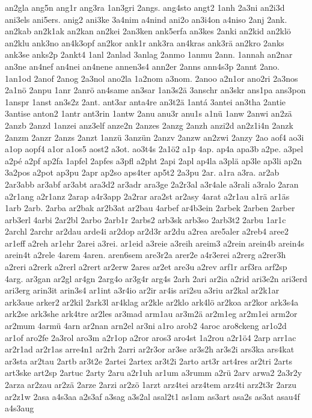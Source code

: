 {an2gla
ang5n
ang1r
ang3ra
1an3gri
2angs.
ang4sto
angt2
1anh
2a3ni
an2i3d
ani3els
ani5ers.
anig2
ani3ke
3a4nim
a4nind
ani2o
an3i4on
a4niso
2anj
2ank.
an2kab
an2k1ak
an2kan
an2kei
2an3ken
ank5erfa
an3kes
2anki
an2kid
an2klö
an2klu
ank3no
an4k3opf
an2kor
ank1r
ank3ra
an4kras
ank3rä
an2kro
2anks
ank3se
anks2p
2ankt4
1anl
2anlad
3anlag
2anmo
1anmu
2ann.
1annah
an2nar
an3ne
an4nef
an4nei
an4nene
annen3s4
ann2er
2anns
ann4s3p
2annt
2ano.
1an1od
2anof
2anog
2a3nol
ano2la
1a2nom
a3nom.
2anoo
a2n1or
ano2ri
2a3nos
2a1nö
2anpu
1anr
2anrö
an4same
an3sar
1an3s2ä
3anschr
an3skr
ans1pa
ans3pon
1anspr
1anst
an3s2z
2ant.
ant3ar
anta4re
an3t2ä
1antá
3antei
an3tha
2antie
3antise
anton2
1antr
ant3rin
1antw
2anu
anu3r
anu1s
a1nü
1anw
2anwi
an2zä
2anzb
2anzd
1anzei
anz3elf
anze2n
2anzes
2anzg
2anzh
anzi2d
an2z1i4n
2anzk
2anzm
2anzr
2anzs
2anzt
1anzü
3anzün
2anzv
2anzw
an2zwi
2anzy
2ao
aof4
ao3i
a1op
aopf4
a1or
a1os5
aost2
a3ot.
ao3t4s
2a1ö2
a1p
4ap.
ap4a
apa3b
a2pe.
a3pel
a2pé
a2pf
ap2fa
1apfel
2apfes
a3pfl
a2pht
2api
2apl
ap4la
a3plä
ap3le
ap3li
ap2n
3a2pos
a2pot
ap3pu
2apr
ap2so
aps4ter
ap5t2
2a3pu
2ar.
a1ra
a3ra.
ar2ab
2ar3abb
ar3abf
ar3abt
ara3d2
ar3adr
ara3ge
2a2r3al
a3r4ale
a3rali
a3ralo
2aran
a2r1ang
a2r1anz
2arap
a4r3app
2a2rar
ara2st
ar2asy
4arat
a2r1au
a1rä
ar1äs
1arb
2arb.
2arba
ar2bak
ar2b3at
ar2bau
4arbef
ar4b3ein
2arbek
2arben
2arber
arb3erl
4arbi
2ar2bl
2arbo
2arb1r
2arbs2
arb3sk
arb3so
2arb3t2
2arbu
1ar1c
2archl
2archr
ar2dau
arde4i
ar2dop
ar2d3r
ar2du
a2rea
are5aler
a2reb4
aree2
ar1eff
a2reh
ar1ehr
2arei
a3rei.
ar1eid
a3reie
a3reih
areim3
a2rein
arein4b
arein4s
arein4t
a2rele
4arem
4aren.
aren6sem
are3r2a
arer2e
a4r3erei
a2rerg
a2rer3h
a2reri
a2rerk
a2rerl
a2rert
ar2erw
2ares
ar2et
are3u
a2rev
arf1r
arf3ra
arf2sp
4arg.
ar3gan
ar2gl
ar4gn
2arg4o
ar3g4r
arg4s
2arh
2ari
ar2ia
a2rid
ari3e2n
ari3erd
ari3erg
arin3it
arin3s4
ar1int
a3r4io
ar2ir
ar4is
ari2su
a3riu
ar2kal
ar2k1ar
ark3aue
arker2
ar2kil
2ark3l
ar4klag
ar2kle
ar2klo
ark4lö
ar2koa
ar2kor
ark3s4a
ark2se
ark3she
ark4tre
ar2les
ar3mad
arm1au
ar3m2ä
ar2m1eg
ar2m1ei
arm2or
ar2mum
4armü
4arn
ar2nan
arn2el
ar3ni
a1ro
arob2
4aroc
aro8ckeng
ar1o2d
ar1of
aro2fe
2a3rol
aro3m
a2r1op
a2ror
aros3
aro4st
1a2rou
a2r1ö4
2arp
arr1ac
ar2r1ad
ar2r1as
arre4n1
ar2rh
2arri
ar2r3or
ar3se
ar3s2h
ar3s2i
ars3ka
ars4kat
ar3sta
ar2tau
2artb
ar3t2e
2artei
2artex
ar3t2i
2arto
art3r
art4res
ar2tri
2arts
art3ske
art2sp
2artuc
2arty
2aru
a2r1uh
ar1um
a3rumm
a2rü
2arv
arwa2
2a3r2y
2arza
ar2zau
ar2zä
2arze
2arzi
ar2zö
1arzt
arz4tei
arz4tem
arz4ti
arz2t3r
2arzu
ar2z1w
2asa
a4s3aa
a2s3af
a3sag
a3s2al
asal2t1
as1am
as3art
asa2s
as3at
asau4f
a4s3aug
}
